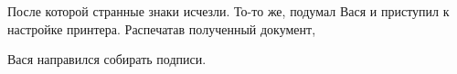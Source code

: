 После которой странные знаки исчезли. То-то же, подумал Вася и приступил к
настройке принтера. Распечатав полученный документ,

\begin{center}
\end{center}

Вася направился собирать подписи.
